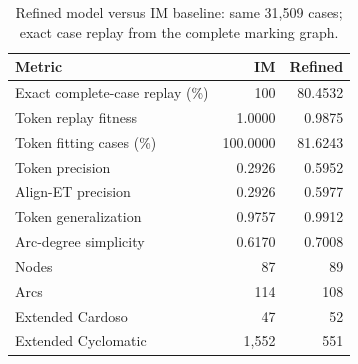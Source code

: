 \begin{table}[htbp]
\centering
\small
\caption{Refined model versus IM baseline: same 31,509 cases; exact case replay from the complete marking graph.}
\label{tab:refined-quality}
\begin{tabular}{@{}lrr@{}}
\toprule
Metric & IM & Refined \\
\midrule
Exact complete-case replay (\%) & 100 & 80.4532 \\
Token replay fitness & 1.0000 & 0.9875 \\
Token fitting cases (\%) & 100.0000 & 81.6243 \\
Token precision & 0.2926 & 0.5952 \\
Align-ET precision & 0.2926 & 0.5977 \\
Token generalization & 0.9757 & 0.9912 \\
Arc-degree simplicity & 0.6170 & 0.7008 \\
Nodes & 87 & 89 \\
Arcs & 114 & 108 \\
Extended Cardoso & 47 & 52 \\
Extended Cyclomatic & 1,552 & 551 \\
\bottomrule
\end{tabular}
\end{table}
